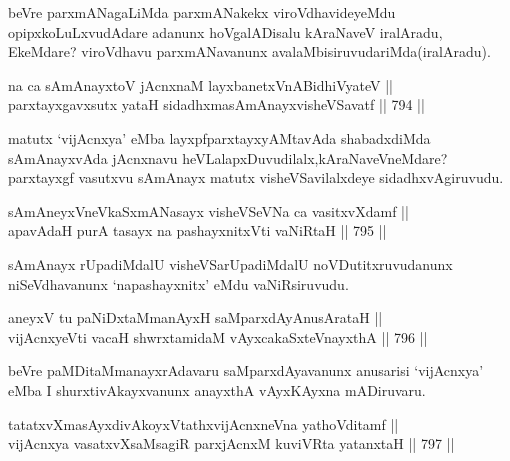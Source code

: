 \begin{artha}
beVre parxmANagaLiMda parxmANakekx viroVdhavideyeMdu opipxkoLuLxvudAdare adanunx hoVgalADisalu kAraNaveV iralAradu, EkeMdare? viroVdhavu parxmANavanunx avalaMbisiruvudariMda(iralAradu).
\end{artha}


\begin{shl}
na ca sAmAnayxtoV jAcnxnaM layxbanetxVnABidhiVyateV || \\
parxtayxgavxsutx yataH sidadhxmasAmAnayxvisheVSavatf \hfill || 794 ||  
\end{shl}

\begin{artha}
matutx `vijAcnxya' eMba layxpfparxtayxyAMtavAda shabadxdiMda sAmAnayxvAda jAcnxnavu heVLalapxDuvudilalx,kAraNaveVneMdare? parxtayxgf vasutxvu sAmAnayx matutx visheVSavilalxdeye sidadhxvAgiruvudu.
\end{artha}


\begin{shl}
sAmAneyxVneVkaSxmANasayx visheVSeVNa ca vasitxvXdamf || \\
apavAdaH purA tasayx na pashayxnitxVti vaNiRtaH \hfill || 795 ||  
\end{shl}

\begin{artha}
sAmAnayx rUpadiMdalU visheVSarUpadiMdalU noVDutitxruvudanunx niSeVdhavanunx `napashayxnitx' eMdu vaNiRsiruvudu.
\end{artha}


\begin{shl}
aneyxV tu paNiDxtaMmanAyxH saMparxdAyAnusArataH || \\
vijAcnxyeVti vacaH shwrxtamidaM vAyxcakaSxteV\s nayxthA \hfill || 796 ||  
\end{shl}

\begin{artha}
beVre paMDitaMmanayxrAdavaru saMparxdAyavanunx anusarisi `vijAcnxya' eMba I shurxtivAkayxvanunx anayxthA vAyxKAyxna mADiruvaru.
\end{artha}


\begin{shl}
tatatxvXmasAyxdivAkoyxVtathxvijAcnxneVna yathoVditamf || \\
vijAcnxya vasatxvXsaMsagiR parxjAcnxM kuviVRta yatanxtaH \hfill || 797 ||  
\end{shl}

